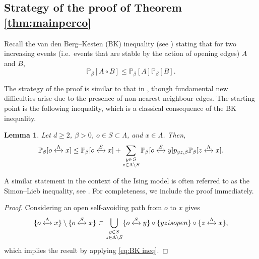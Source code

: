 \documentclass[11pt,a4paper]{article}
\numberwithin{equation}{section}
\theoremstyle{plain}
\newtheorem{Lem}[Thm]{Lemma}
\theoremstyle{definition}
\newcommand{\connect}{\xleftrightarrow}
\begin{document}
\subsection{Strategy of the proof of Theorem \ref{thm:mainperco}}\label{section: strategy}
Recall the van den Berg--Kesten (BK) inequality (see \cite[Section~2.3]{GrimmettPercolation1999}) stating that for two increasing events (i.e.~events that are stable by the action of opening edges) $A$ and $B$,
\begin{equation}\label{eq:BK ineq}
\mathbb P_\beta[A\circ B]\le \mathbb P_\beta[A]\mathbb P_\beta[B].\tag{BK}
\end{equation}


The strategy of the proof is similar to that in \cite{DumPan24WSAW}, though fundamental new difficulties arise due to the presence of non-nearest neighbour edges. The starting point is the following inequality, which is a classical consequence of the BK inequality. 

\begin{Lem}\label{Lem: SL upper bound} Let $d\geq 2$, $\beta>0$, $o\in S\subset \Lambda$, and $x\in \Lambda$. Then,
\begin{equation}\label{eq:SLperco}
	\mathbb P_{\beta}[o\connect{\Lambda\:}x]\le \mathbb P_{\beta}[o\connect{S\:}x]+ \sum_{\substack{y\in S\\ z\in \Lambda\setminus S}}\mathbb P_{\beta}[o\connect{S\:}y]p_{yz,\beta}\mathbb P_{\beta}[z\connect{\Lambda\:}x].
\end{equation}
\end{Lem}
A similar statement in the context of the Ising model is often referred to as the Simon--Lieb inequality, see \cite{SimonInequalityIsing1980,LiebImprovementSimonInequality}. For completeness, we include the proof immediately.
\begin{proof} Considering an open self-avoiding path from $o$ to $x$ gives
\begin{equation}
	\{o\connect{\Lambda\:}x\}\setminus \{o\connect{S\:}x\}\subset \bigcup_{\substack{y\in S\\ z\in \Lambda\setminus S}}\{o\connect{S\:}y\}\circ\{yz\textup{ is open}\}\circ \{z\connect{\Lambda\:}x\},
\end{equation}
which implies the result by applying \eqref{eq:BK ineq}.
\end{proof}
\end{document}
